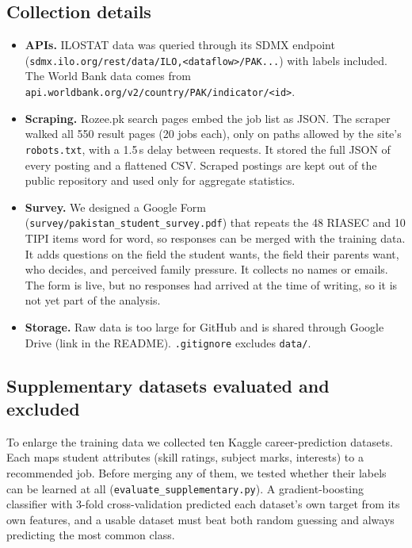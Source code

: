 \documentclass[11pt,a4paper]{article}
\begin{document}
\subsection{Collection details}
\begin{itemize}
\item \textbf{APIs.} ILOSTAT data was queried through its SDMX endpoint
      (\nolinkurl{sdmx.ilo.org/rest/data/ILO,<dataflow>/PAK...}) with labels included. The World Bank
      data comes from \nolinkurl{api.worldbank.org/v2/country/PAK/indicator/<id>}.
\item \textbf{Scraping.} Rozee.pk search pages embed the job list as JSON. The scraper walked all
      550 result pages (20 jobs each), only on paths allowed by the site's \texttt{robots.txt},
      with a 1.5\,s delay between requests. It stored the full JSON of every posting and a
      flattened CSV. Scraped postings are kept out of the public repository and used only for
      aggregate statistics.
\item \textbf{Survey.} We designed a Google Form (\texttt{survey/pakistan\_student\_survey.pdf})
      that repeats the 48 RIASEC and 10 TIPI items word for word, so responses can be merged with
      the training data. It adds questions on the field the student wants, the field their parents
      want, who decides, and perceived family pressure. It collects no names or emails. The form is
      live, but no responses had arrived at the time of writing, so it is not yet part of the
      analysis.
\item \textbf{Storage.} Raw data is too large for GitHub and is shared through Google Drive
      (link in the README). \texttt{.gitignore} excludes \texttt{data/}.
\end{itemize}

\subsection{Supplementary datasets evaluated and excluded}\label{sec:excluded}
To enlarge the training data we collected ten Kaggle career-prediction datasets. Each maps
student attributes (skill ratings, subject marks, interests) to a recommended job. Before
merging any of them, we tested whether their labels can be learned at all
(\texttt{evaluate\_supplementary.py}). A gradient-boosting classifier with 3-fold
cross-validation predicted each dataset's own target from its own features, and a usable dataset
must beat both random guessing and always predicting the most common class.
\end{document}
